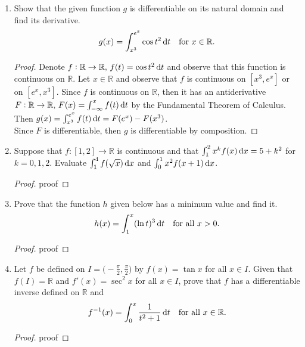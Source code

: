 \documentclass{article}
\begin{document}
\begin{enumerate}
        \item Show that the given function $g$ is differentiable on its natural domain and find its derivative.
            \[g(x) = \int_{x^3}^{e^x} \cos t^2 \dif t \quad \text{for $x \in \mathbb{R}$}.\]
        \begin{proof}
            Denote $f:\mathbb{R} \to \mathbb{R}, \, f(t) = \cos t^2 \dif t$ and observe that this function is continuous on $\mathbb{R}$. Let $x \in \mathbb{R}$ and observe that $f$ is continuous on $[x^3,e^x]$ or on $[e^x,x^3]$. Since $f$ is continuous on $\mathbb{R}$, then it has an antiderivative $F:\mathbb{R} \to \mathbb{R}, \, F(x) = \int_{-\infty}^x f(t) \dif t$ by the Fundamental Theorem of Calculus. Then $g(x) = \int_{x^3}^{e^x} f(t) \dif t = F(e^x)-F(x^3)$.\\Since $F$ is differentiable, then $g$ is differentiable by composition. 
        \end{proof}
    
        \item Suppose that $f:[1,2] \to \mathbb{R}$ is continuous and that $\int_1^2 x^k f(x) \dif x = 5+k^2$ for $k=0,1,2$. Evaluate $\int_1^4 f(\sqrt{x}) \dif x$ and $\int_0^1 x^2 f(x+1) \dif x$.\\
        \begin{proof}
            proof
        \end{proof}
        
        \item Prove that the function $h$ given below has a minimum value and find it.
            \[h(x) = \int_1^x (\ln t)^3 \dif t \quad \text{for all $x > 0$}.\]
        \begin{proof}
            proof
        \end{proof}
        
        \item Let $f$ be defined on $I = \big(-\frac{\pi}{2}, \frac{\pi}{2}\big)$ by $f(x) = \tan x$ for all $x \in I$. Given that $f(I) = \mathbb{R}$ and $f'(x) = \sec^2 x$ for all $x \in I$, prove that $f$ has a differentiable inverse defined on $\mathbb{R}$ and
            \[f^{-1}(x) = \int_0^x \frac{1}{t^2+1} \dif t \quad \text{for all $x \in \mathbb{R}$}.\]
        \begin{proof}
            proof
        \end{proof}
    

\end{enumerate}
\end{document}
